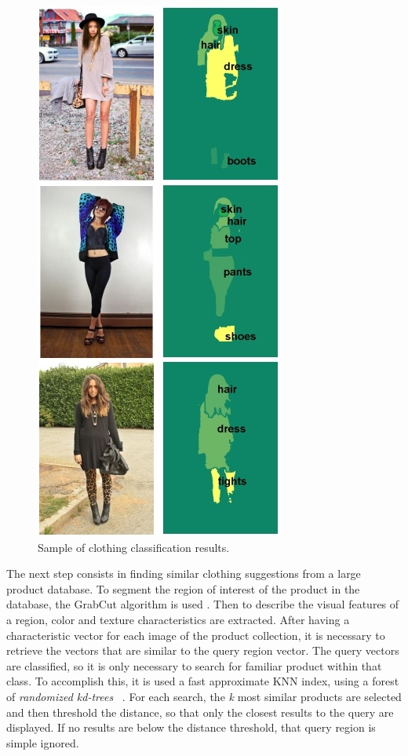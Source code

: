 \documentclass[titlepage,12pt,a4paper,times]{book}
\begin{document}
\begin{figure}[!h]
\centering
\includegraphics[scale=0.7]{images/2_4_fig4.jpg}
\caption{Sample of clothing classification results.}
\label{fig:sccr}
\end{figure}
\FloatBarrier

The next step consists in finding similar clothing suggestions from a large
product database. To segment the region of interest of the product in the
database, the GrabCut algorithm is used \citep{7}. Then to describe the visual
features of a region, color and texture characteristics are extracted.  After
having a characteristic vector for each image of the product collection, it is
necessary to retrieve the vectors that are similar to the query region vector.
The query vectors are classified, so it is only necessary to search for
familiar product within that class. To accomplish this, it is used a fast
approximate \ac{KNN} index, using a forest of \emph{randomized kd-trees}
~\citep{12}. For each search, the \emph{k} most similar products are selected
and then threshold the distance, so that only the closest results to the query
are displayed. If no results are below the distance threshold, that query
region is simple ignored.
\end{document}
